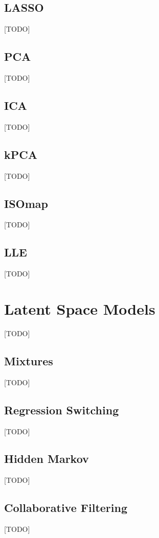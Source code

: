 \documentclass[12pt,a4paper]{article}
\theoremstyle{plain}
\theoremstyle{definition}
\begin{document}
\subsection{LASSO}
[TODO]

\subsection{PCA}
[TODO]

\subsection{ICA}
[TODO]

\subsection{kPCA}
[TODO]

\subsection{ISOmap}
[TODO]


\subsection{LLE}
[TODO]


\section{Latent Space Models}
\label{sec:latent_space}
[TODO]


\subsection{Mixtures}
[TODO]


\subsection{Regression Switching}
[TODO]



\subsection{Hidden Markov}
[TODO]


\subsection{Collaborative Filtering}
[TODO]





\end{document}
